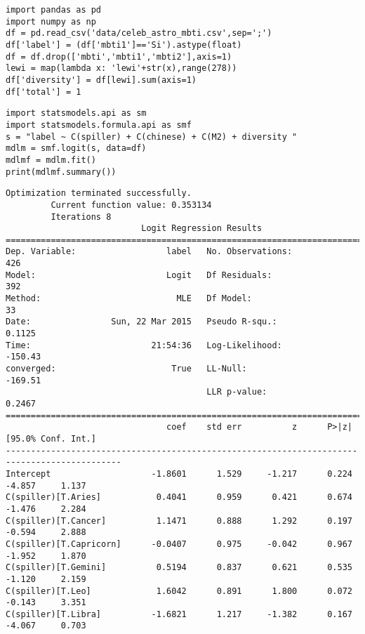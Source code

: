 \documentclass[12pt,fleqn]{article}\usepackage{../common}
\begin{document}
\begin{verbatim}
import pandas as pd
import numpy as np
df = pd.read_csv('data/celeb_astro_mbti.csv',sep=';')
df['label'] = (df['mbti1']=='Si').astype(float)
df = df.drop(['mbti','mbti1','mbti2'],axis=1)
lewi = map(lambda x: 'lewi'+str(x),range(278))
df['diversity'] = df[lewi].sum(axis=1)
df['total'] = 1
\end{verbatim}


\begin{verbatim}
import statsmodels.api as sm
import statsmodels.formula.api as smf
s = "label ~ C(spiller) + C(chinese) + C(M2) + diversity "
mdlm = smf.logit(s, data=df)
mdlmf = mdlm.fit()
print(mdlmf.summary())
\end{verbatim}

\begin{verbatim}
Optimization terminated successfully.
         Current function value: 0.353134
         Iterations 8
                           Logit Regression Results                           
==============================================================================
Dep. Variable:                  label   No. Observations:                  426
Model:                          Logit   Df Residuals:                      392
Method:                           MLE   Df Model:                           33
Date:                Sun, 22 Mar 2015   Pseudo R-squ.:                  0.1125
Time:                        21:54:36   Log-Likelihood:                -150.43
converged:                       True   LL-Null:                       -169.51
                                        LLR p-value:                    0.2467
=============================================================================================
                                coef    std err          z      P>|z|      [95.0% Conf. Int.]
---------------------------------------------------------------------------------------------
Intercept                    -1.8601      1.529     -1.217      0.224        -4.857     1.137
C(spiller)[T.Aries]           0.4041      0.959      0.421      0.674        -1.476     2.284
C(spiller)[T.Cancer]          1.1471      0.888      1.292      0.197        -0.594     2.888
C(spiller)[T.Capricorn]      -0.0407      0.975     -0.042      0.967        -1.952     1.870
C(spiller)[T.Gemini]          0.5194      0.837      0.621      0.535        -1.120     2.159
C(spiller)[T.Leo]             1.6042      0.891      1.800      0.072        -0.143     3.351
C(spiller)[T.Libra]          -1.6821      1.217     -1.382      0.167        -4.067     0.703

\end{verbatim}
\end{document}
